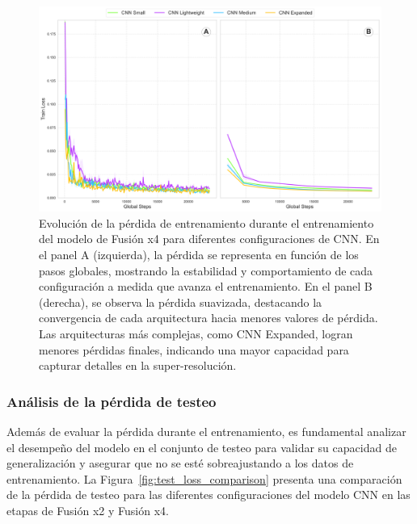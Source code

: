             \begin{figure}[H]
                \centering
                \includegraphics[width=1\linewidth]{images/loss_train_fusionx4.png}
                \caption{Evolución de la pérdida de entrenamiento durante el entrenamiento del modelo de Fusión x4 para diferentes configuraciones de CNN. En el panel A (izquierda), la pérdida se representa en función de los pasos globales, mostrando la estabilidad y comportamiento de cada configuración a medida que avanza el entrenamiento. En el panel B (derecha), se observa la pérdida suavizada, destacando la convergencia de cada arquitectura hacia menores valores de pérdida. Las arquitecturas más complejas, como CNN Expanded, logran menores pérdidas finales, indicando una mayor capacidad para capturar detalles en la super-resolución.}
                \label{fig:loss_train_fusionx4}
            \end{figure}

        \subsubsection{Análisis de la pérdida de testeo}

            Además de evaluar la pérdida durante el entrenamiento, es fundamental analizar el desempeño del modelo en el conjunto de testeo para validar su capacidad de generalización y asegurar que no se esté sobreajustando a los datos de entrenamiento. La Figura~\ref{fig:test_loss_comparison} presenta una comparación de la pérdida de testeo para las diferentes configuraciones del modelo CNN en las etapas de Fusión x2 y Fusión x4.

